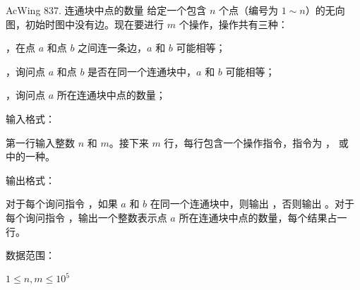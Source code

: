 \begin{titledbox}{AcWing 837. 连通块中点的数量}
    给定一个包含 $n$ 个点（编号为 $1 \sim n$）的无向图，初始时图中没有边。现在要进行 $m$ 个操作，操作共有三种：
    \begin{myenum}
        \item {}，在点 $a$ 和点 $b$ 之间连一条边，$a$ 和 $b$ 可能相等；
        \item {}，询问点 $a$ 和点 $b$ 是否在同一个连通块中，$a$ 和 $b$ 可能相等；
        \item {}，询问点 $a$ 所在连通块中点的数量；
    \end{myenum}

    输入格式：

    第一行输入整数 $n$ 和 $m$。接下来 $m$ 行，每行包含一个操作指令，指令为 ， 或  中的一种。

    输出格式：

    对于每个询问指令 ，如果 $a$ 和 $b$ 在同一个连通块中，则输出  ，否则输出  。对于每个询问指令  ，输出一个整数表示点 $a$ 所在连通块中点的数量，每个结果占一行。

    数据范围：

    $1 \le n,m \le 10^5$

    \begin{inputblock}
         \\
         \\
         \\
         \\
         \\
    \end{inputblock}
    \begin{outputblock}
         \\
         \\
    \end{outputblock}
\end{titledbox}

